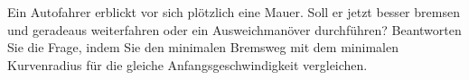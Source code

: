 Ein Autofahrer erblickt vor sich plötzlich eine Mauer. Soll er jetzt besser bremsen und geradeaus weiterfahren oder ein Ausweichmanöver durchführen? Beantworten Sie die Frage, indem Sie den minimalen Bremsweg mit dem minimalen Kurvenradius für die gleiche Anfangsgeschwindigkeit vergleichen.
